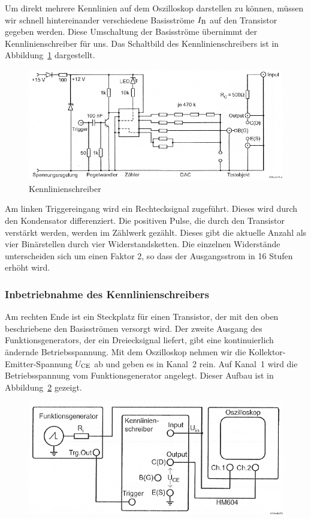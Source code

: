 Um direkt mehrere Kennlinien auf dem Oszilloskop darstellen zu können, müssen
wir schnell hintereinander verschiedene Basisströme $I_\text{B}$ auf den Transistor
gegeben werden. Diese Umschaltung der Basisströme übernimmt der
Kennlinienschreiber für uns. Das Schaltbild des Kennlinienschreibers ist in
Abbildung~\ref{fig:3-1} dargestellt.

\begin{figure}[htbp]
	\centering
	\includegraphics[width=\textwidth]{Anleitung/3-1.png}
	\caption{
		Kennlinienschreiber \cite[Abbildung~3.1]{physik313-Anleitung}
	}
	\label{fig:3-1}
\end{figure}

Am linken Triggereingang wird ein
Rechtecksignal zugeführt. Dieses wird durch den Kondensator differenziert. Die
positiven Pulse, die durch den Transistor verstärkt werden, werden im Zählwerk
gezählt. Dieses gibt die aktuelle Anzahl als vier Binärstellen durch vier
Widerstandsketten. Die einzelnen Widerstände unterscheiden sich um einen Faktor
2, so dass der Ausgangsstrom in 16 Stufen erhöht wird.

\subsubsection{Inbetriebnahme des Kennlinienschreibers}

Am rechten Ende ist ein Steckplatz für einen Transistor, der mit den oben
beschriebene den Basisströmen versorgt wird. Der zweite Ausgang des
Funktionsgenerators, der ein Dreiecksignal liefert, gibt eine kontinuierlich
ändernde Betriebsspannung. Mit dem Oszilloskop nehmen wir die
Kollektor-Emitter-Spannung $U_\text{CE}$ ab und geben es in Kanal~2 rein. Auf Kanal~1
wird die Betriebsspannung vom Funktionsgenerator angelegt. Dieser Aufbau ist in
Abbildung~\ref{fig:3-2} gezeigt.

\begin{figure}[htbp]
	\centering
	\includegraphics[width=\textwidth]{Anleitung/3-2.png}
	\caption{
		\cite[Abbildung~3.2]{physik313-Anleitung}
	}
	\label{fig:3-2}
\end{figure}

